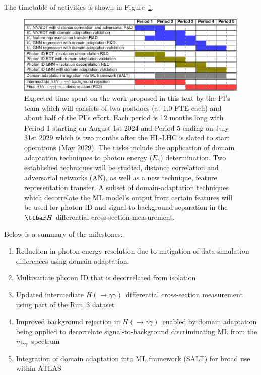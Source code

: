 \documentclass[letter, USenglish, 11pt, subfigure]{article}
\newcommand{\myy}{\ensuremath{m_{\gamma\gamma}}}
\newcommand{\hyy}{\ensuremath{H(\to\gamma\gamma)}}
\begin{document}
The timetable of activities is shown in Figure~\ref{fig:timetable}.
\begin{figure}[!htbp]
  \centering
  \includegraphics[width=\textwidth]{figures/timeline.pdf}
  \caption{Expected time spent on the work proposed in this text by the PI's team which will consists of two postdocs (at 1.0 FTE each) and about half of the PI's effort. Each period is 12 months long with Period 1 starting on August 1st 2024 and Period 5 ending on July 31st 2029 which is two months after the HL-LHC is slated to start operations (May 2029). The tasks include the application of domain adaptation  techniques to photon energy ($E_{\gamma}$) determination. Two established techniques will be studied, distance correlation and adversarial networks (AN), as well as a new technique, feature representation transfer. A subset of domain-adaptation techniques which decorrelate the ML model's output from certain features will be used for photon ID and signal-to-background separation in the $\ttbar H$ differential cross-section measurement.
  }
  \label{fig:timetable}
\end{figure}

Below is a summary of the milestones:
\begin{enumerate}
\item Reduction in photon energy resolution due to mitigation of data-simulation differences using domain adaptation.
\item Multivariate photon ID that is decorrelated from isolation
\item Updated intermediate \hyy\ differential cross-section measurement using part of the Run~3 dataset
\item Improved background rejection in \hyy\ enabled by domain adaptation being applied to decorrelate signal-to-background discriminating ML from the \myy\ spectrum
\item Integration of domain adaptation into ML framework (SALT) for broad use within ATLAS
\end{enumerate}
\end{document}
